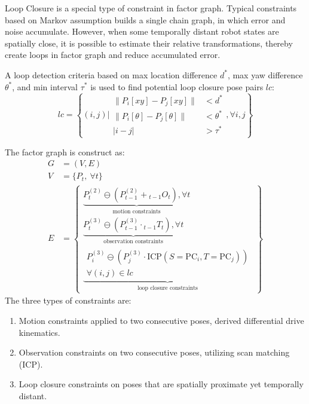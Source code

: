 \documentclass[conference]{IEEEtran}
\begin{document}
Loop Closure is a special type of constraint in factor graph.
Typical constraints based on Markov assumption builds a single chain graph, 
in which error and noise accumulate.
However, when some temporally distant robot states are spatially close,
it is possible to estimate their relative transformations,
thereby create loops in factor graph and reduce accumulated error.

A loop detection criteria based on max location difference $d^*$, 
max yaw difference $\theta^*$, and min interval $\tau^*$
is used to find potential loop closure pose pairs $lc$:
$$
lc = \left\{(i, j) \bigg| 
\begin{aligned}
    \| P_{i}[xy]-P_{j}[xy]\| &< d^*\\ 
    \| P_{i}[\theta]-P_{j}[\theta]\| &< \theta^* \\
    |i-j|&>\tau^*
\end{aligned} 
, \forall i, j\right\}
$$

The factor graph is construct as:
$$
\begin{aligned}
G &= (V, E) \\
V &= \{ P_{t},\ \forall t\} \\
E &= \left\{ \begin{gathered}
\underbrace{P_{t}^{(2)} \ominus \left(P_{t-1}^{(2)} + {}_{t-1}O_{t} \right),\forall t}_{\text{motion constraints}} \\
\underbrace{P_{t}^{(3)} \ominus \left(P_{t-1}^{(3)} \cdot {}_{t-1}T_{t} \right),\forall t}_{\text{observation constraints}} \\
\underbrace{\begin{gathered} P_{i}^{(3)} \ominus \left(P_{j}^{(3)} \cdot \text{ICP}(S=\mathrm{PC}_{i}, T=\mathrm{PC}_{j}) \right) \\ \forall (i,j) \in lc \end{gathered}}_{\text{loop closure constraints}}
\end{gathered} \right\}
\end{aligned}
$$
The three types of constraints are:
\begin{enumerate}
\item Motion constraints applied to two consecutive poses, derived differential drive kinematics.
\item Observation constraints on two consecutive poses, utilizing scan matching (ICP).
\item Loop closure constraints on poses that are spatially proximate yet temporally distant.
\end{enumerate}
\end{document}
